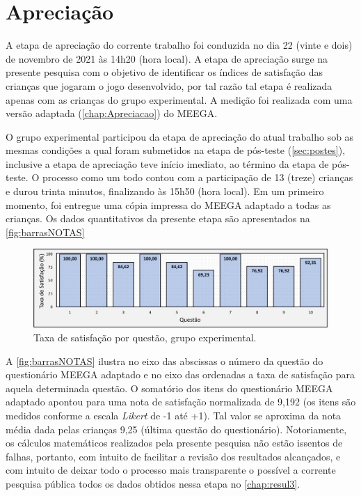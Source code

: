 \section{Apreciação}\label{sec:apreciar}

A etapa de apreciação do corrente trabalho foi conduzida no dia 22 (vinte e dois) de novembro de 2021 às 14h20 (hora local). A etapa de apreciação surge na presente pesquisa com o objetivo de identificar os índices de satisfação das crianças que jogaram o jogo desenvolvido, por tal razão tal etapa é realizada apenas com as crianças do grupo experimental. A medição foi realizada com uma versão adaptada (\autoref{chap:Apreciacao}) do \acf{MEEGA}.

O grupo experimental participou da etapa de apreciação do atual trabalho sob as mesmas condições a qual foram submetidos na etapa de pós-teste (\autoref{sec:postes}), inclusive a etapa de apreciação teve início imediato, ao término da etapa de pós-teste. O processo como um todo contou com a participação de 13 (treze) crianças e durou trinta minutos, finalizando às 15h50 (hora local). Em um primeiro momento, foi entregue uma cópia impressa do \ac{MEEGA} adaptado a todas as crianças. Os dados quantitativos da presente etapa são apresentados na \autoref{fig:barrasNOTAS}

\begin{figure}[htb]
    \caption{\label{fig:barrasNOTAS}Taxa de satisfação por questão, grupo experimental.}
    \includegraphics[width=\linewidth]{./Visuais/NotasTaxa.pdf}
\end{figure}

A \autoref{fig:barrasNOTAS} ilustra no eixo das abscissas o número da questão do questionário \ac{MEEGA} adaptado e no eixo das ordenadas a taxa de satisfação para aquela determinada questão. O somatório dos itens do questionário \ac{MEEGA} adaptado apontou para uma nota de satisfação normalizada de 9,192 (os itens são medidos conforme a escala \textit{Likert} de -1 até +1). Tal valor se aproxima da nota média dada pelas crianças 9,25 (última questão do questionário). Notoriamente, os cálculos matemáticos realizados pela presente pesquisa não estão issentos de falhas, portanto, com intuito de facilitar a revisão dos resultados alcançados, e com intuito de deixar todo o processo mais transparente o possível a corrente pesquisa pública todos os dados obtidos nessa etapa no \autoref{chap:resul3}.

